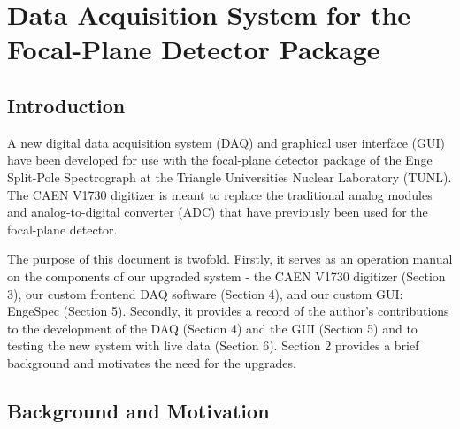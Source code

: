 \chapter{Data Acquisition System for the Focal-Plane Detector Package}
\label{ch:DAQ}


\section{Introduction}

A new digital data acquisition system (DAQ) and graphical user interface (GUI) have been developed for use with the focal-plane detector package \cite{Marshall2019} of the Enge Split-Pole Spectrograph at the Triangle Universities Nuclear Laboratory (TUNL). The CAEN V1730 digitizer is meant to replace the traditional analog modules and analog-to-digital converter (ADC) that have previously been used for the focal-plane detector.

The purpose of this document is twofold. Firstly, it serves as an operation manual on the components of our upgraded system - the CAEN V1730 digitizer (Section 3), our custom frontend DAQ software (Section 4), and our custom GUI: EngeSpec (Section 5). Secondly, it provides a record of the author's contributions to the development of the DAQ (Section 4) and the GUI (Section 5) and to testing the new system with live data (Section 6). Section 2 provides a brief background and motivates the need for the upgrades.



\pagebreak
\section{Background and Motivation} \label{motivation}


